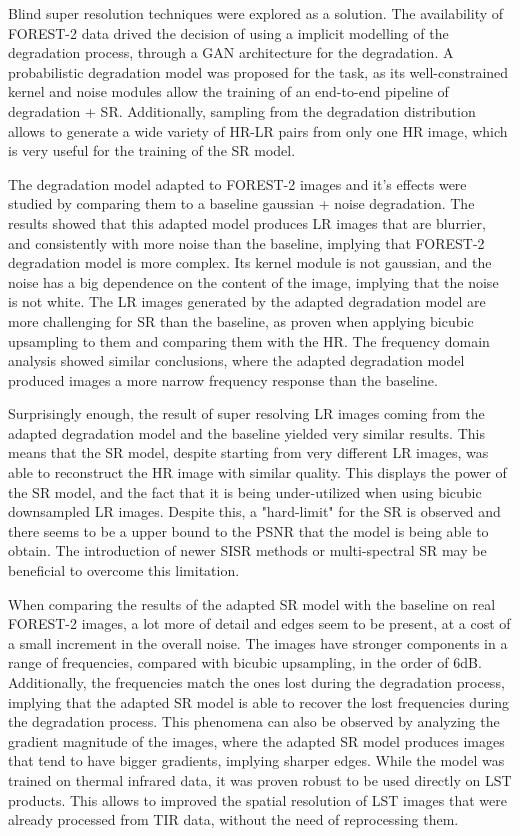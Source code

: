 Blind super resolution techniques were explored as a solution. The availability of FOREST-2 data drived the decision of using a implicit modelling of the degradation process, through a GAN architecture for the degradation. A probabilistic degradation model was proposed for the task, as its well-constrained kernel and noise modules allow the training of an end-to-end pipeline of degradation + SR. Additionally, sampling from the degradation distribution allows to generate a wide variety of HR-LR pairs from only one HR image, which is very useful for the training of the SR model.

The degradation model adapted to FOREST-2 images and it's effects were studied by comparing them to a baseline gaussian + noise degradation. The results showed that this adapted model produces LR images that are blurrier, and consistently with more noise than the baseline, implying that FOREST-2 degradation model is more complex.
Its kernel module is not gaussian, and the noise has a big dependence on the content of the image, implying that the noise is not white. 
The LR images generated by the adapted degradation model are more challenging for SR than the baseline, as proven when applying bicubic upsampling to them and comparing them with the HR.  
The frequency domain analysis showed similar conclusions, where the adapted degradation model produced images a more narrow frequency response than the baseline.

Surprisingly enough, the result of super resolving LR images coming from the adapted degradation model and the baseline yielded very similar results. This means that the SR model, despite starting from very different LR images, was able to reconstruct the HR image with similar quality. This displays the power of the SR model, and the fact that it is being under-utilized when using bicubic downsampled LR images. Despite this, a "hard-limit" for the SR is observed and there seems to be a upper bound to the PSNR that the model is being able to obtain. The introduction of newer SISR methods or multi-spectral SR may be beneficial to overcome this limitation.

When comparing the results of the adapted SR model with the baseline on real FOREST-2 images, a lot more of detail and edges seem to be present, at a cost of a small increment in the overall noise. 
The images have stronger components in a range of frequencies, compared with bicubic upsampling, in the order of 6dB. Additionally, the frequencies match the ones lost during the degradation process, implying that the adapted SR model is able to recover the lost frequencies during the degradation process.
This phenomena can also be observed by analyzing the gradient magnitude of the images, where the adapted SR model produces images that tend to have bigger gradients, implying sharper edges. 
While the model was trained on thermal infrared data, it was proven robust to be used directly on LST products. This allows to improved the spatial resolution of LST images that were already processed from TIR data, without the need of reprocessing them.

